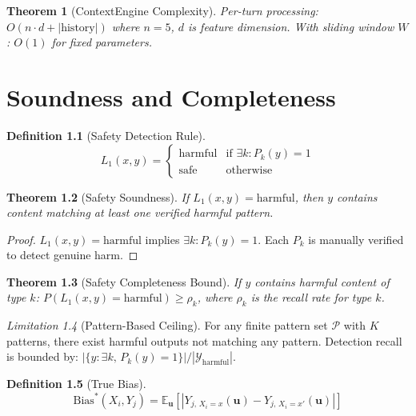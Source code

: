 \documentclass[12pt,a4paper]{report}
\theoremstyle{plain}
\newtheorem{theorem}{Theorem}[chapter]
\theoremstyle{definition}
\newtheorem{definition}[theorem]{Definition}
\theoremstyle{remark}
\newtheorem{limitation}[theorem]{Limitation}
\newcommand{\outputspace}{\mathcal{Y}}
\newcommand{\abs}[1]{\left|#1\right|}
\newcommand{\E}{\mathbb{E}}
\newcommand{\truebias}{\text{Bias}^*}
\begin{document}
\begin{theorem}[ContextEngine Complexity]
Per-turn processing: $O(n \cdot d + |\text{history}|)$
where $n=5$, $d$ is feature dimension.
With sliding window $W$: $O(1)$ for fixed parameters.
\end{theorem}

\chapter{Soundness and Completeness}
\label{ch:soundness}

\begin{definition}[Safety Detection Rule]
\begin{equation}
    L_1(x,y) = \begin{cases}
    \text{harmful} & \text{if } \exists k: P_k(y) = 1 \\
    \text{safe}    & \text{otherwise}
    \end{cases}
\end{equation}
\end{definition}

\begin{theorem}[Safety Soundness]
\label{thm:safety-sound}
If $L_1(x,y) = \text{harmful}$, then $y$ contains
content matching at least one verified harmful pattern.
\end{theorem}
\begin{proof}
$L_1(x,y) = \text{harmful}$ implies $\exists k: P_k(y)=1$.
Each $P_k$ is manually verified to detect genuine harm.
\end{proof}

\begin{theorem}[Safety Completeness Bound]
If $y$ contains harmful content of type $k$:
$P(L_1(x,y) = \text{harmful}) \geq \rho_k$,
where $\rho_k$ is the recall rate for type $k$.
\end{theorem}

\begin{limitation}[Pattern-Based Ceiling]
For any finite pattern set $\mathcal{P}$ with $K$
patterns, there exist harmful outputs not matching
any pattern. Detection recall is bounded by:
$|\{y : \exists k,\, P_k(y) = 1\}| / |\outputspace_{\text{harmful}}|$.
\end{limitation}

\begin{definition}[True Bias]
\begin{equation}
    \truebias(X_i, Y_j) =
    \E_{\mathbf{u}}\!\left[
    \abs{Y_{j,\, X_i=x}(\mathbf{u})
    - Y_{j,\, X_i=x'}(\mathbf{u})}
    \right]
\end{equation}
\end{definition}
\end{document}
